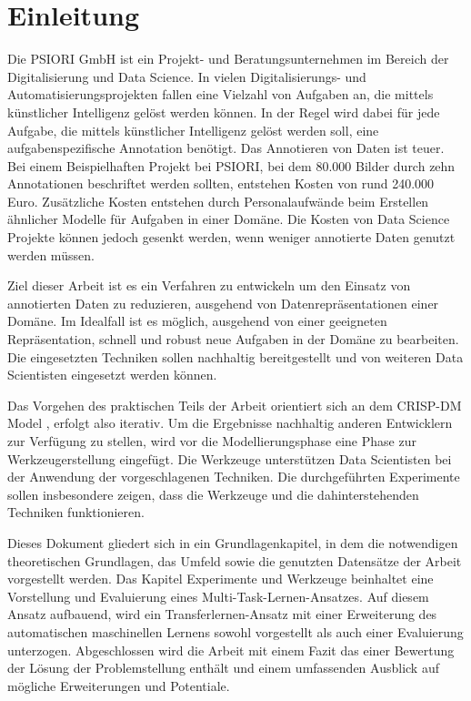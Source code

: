 \listoftodos

\chapter{Einleitung}
\label{chap:Einleitung}
	Die PSIORI GmbH \cite{PSIORIGmbH.2020} ist ein Projekt- und Beratungsunternehmen im Bereich der Digitalisierung und Data Science. In vielen Digitalisierungs- und Automatisierungsprojekten fallen eine Vielzahl von Aufgaben an, die mittels künstlicher Intelligenz gelöst werden können. In der Regel wird dabei für jede Aufgabe, die mittels künstlicher Intelligenz gelöst werden soll, eine aufgabenspezifische Annotation benötigt. Das Annotieren von Daten ist teuer. Bei einem Beispielhaften Projekt bei PSIORI, bei dem 80.000 Bilder durch zehn Annotationen beschriftet werden sollten, entstehen Kosten von rund 240.000 Euro. Zusätzliche Kosten entstehen durch Personalaufwände beim Erstellen ähnlicher Modelle für Aufgaben in einer Domäne. Die Kosten von Data Science Projekte können jedoch gesenkt werden, wenn weniger annotierte Daten genutzt werden müssen.
	
	Ziel dieser Arbeit ist es ein Verfahren zu entwickeln um den Einsatz von annotierten Daten zu reduzieren, ausgehend von Datenrepräsentationen einer Domäne. Im Idealfall ist es möglich, ausgehend von einer geeigneten Repräsentation, schnell und robust neue Aufgaben in der Domäne zu bearbeiten. Die eingesetzten Techniken sollen nachhaltig bereitgestellt und von weiteren Data Scientisten eingesetzt werden können.
	
	Das Vorgehen des praktischen Teils der Arbeit orientiert sich an dem CRISP-DM Model \cite{Shearer.2000}, erfolgt also iterativ. Um die Ergebnisse nachhaltig anderen Entwicklern zur Verfügung zu stellen, wird vor die Modellierungsphase eine Phase zur Werkzeugerstellung eingefügt. Die Werkzeuge unterstützen Data Scientisten bei der Anwendung der vorgeschlagenen Techniken. Die durchgeführten Experimente sollen insbesondere zeigen, dass die Werkzeuge und die dahinterstehenden Techniken funktionieren. 
	
	Dieses Dokument gliedert sich in ein Grundlagenkapitel, in dem die notwendigen theoretischen Grundlagen, das Umfeld sowie die genutzten Datensätze der Arbeit vorgestellt werden. Das Kapitel Experimente und Werkzeuge beinhaltet eine Vorstellung und Evaluierung eines Multi-Task-Lernen-Ansatzes. Auf diesem Ansatz aufbauend, wird ein Transferlernen-Ansatz mit einer Erweiterung des automatischen maschinellen Lernens sowohl vorgestellt als auch einer Evaluierung unterzogen. Abgeschlossen wird die Arbeit mit einem Fazit das einer Bewertung der Lösung der Problemstellung enthält und einem umfassenden Ausblick auf mögliche Erweiterungen und Potentiale.
